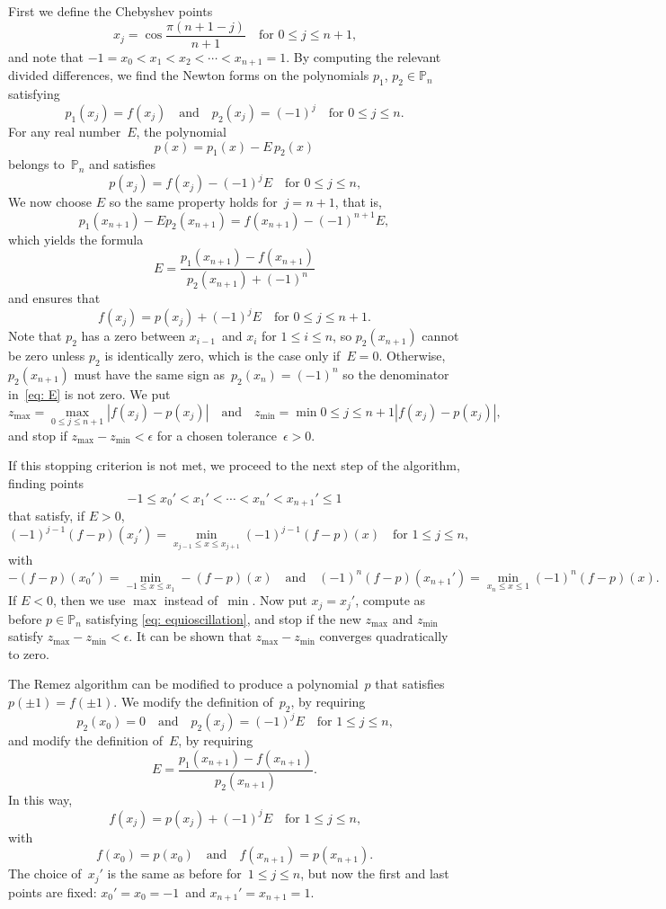\documentclass[12pt,a4paper]{article}
\begin{document}
First we define the Chebyshev points
\[
x_j=\cos\frac{\pi(n+1-j)}{n+1}\quad\text{for $0\le j\le n+1$,}
\]
and note that $-1=x_0<x_1<x_2<\cdots<x_{n+1}=1$.  By computing the relevant 
divided differences, we find the Newton forms on the polynomials $p_1$, 
$p_2\in\mathbb{P}_n$ satisfying
\[
p_1(x_j)=f(x_j)\quad\text{and}\quad p_2(x_j)=(-1)^j
\quad\text{for $0\le j\le n$.}
\]
For any real number~$E$, the polynomial
\[
p(x)=p_1(x)-E\,p_2(x)
\]
belongs to~$\mathbb{P}_n$ and satisfies
\[
p(x_j)=f(x_j)-(-1)^jE\quad\text{for $0\le j\le n$,}
\]
We now choose $E$ so the same property holds for~$j=n+1$, that is,
\[
p_1(x_{n+1})-Ep_2(x_{n+1})=f(x_{n+1})-(-1)^{n+1}E,
\]
which yields the formula
\begin{equation}\label{eq: E}
E=\frac{p_1(x_{n+1})-f(x_{n+1})}{p_2(x_{n+1})+(-1)^n}
\end{equation}
and ensures that
\begin{equation}\label{eq: equioscillation}
f(x_j)=p(x_j)+(-1)^jE\quad\text{for $0\le j\le n+1$.}
\end{equation}
Note that $p_2$ has a zero between $x_{i-1}$~and $x_i$ for $1\le i\le n$, 
so $p_2(x_{n+1})$ cannot be zero unless $p_2$ is identically zero, which is the 
case only if~$E=0$.  Otherwise, $p_2(x_{n+1})$ must have the same sign 
as~$p_2(x_n)=(-1)^n$ so the denominator in~\eqref{eq: E} is not zero.  We put
\[
z_{\max}=\max_{0\le j\le n+1}|f(x_j)-p(x_j)|
\quad\text{and}\quad
z_{\min}=\min{0\le j\le n+1}|f(x_j)-p(x_j)|,
\]
and stop if $z_{\max}-z_{\min}<\epsilon$ for a chosen tolerance~$\epsilon>0$.

If this stopping criterion is not met, we proceed to the next step of the 
algorithm, finding points
\[
-1\le x_0'< x_1'<\cdots<x_n'<x_{n+1}'\le1
\]
that satisfy, if $E>0$,
\[
(-1)^{j-1}(f-p)(x_j')=\min_{x_{j-1}\le x\le x_{j+1}}(-1)^{j-1}(f-p)(x)
\quad\text{for $1\le j\le n$,}
\]
with
\[
-(f-p)(x_0')=\min_{-1\le x\le x_1}-(f-p)(x)
\quad\text{and}\quad
(-1)^n(f-p)(x_{n+1}')=\min_{x_n\le x\le1}(-1)^n(f-p)(x).
\]
If $E<0$, then we use $\max$ instead of~$\min$.  Now put $x_j=x_j'$, compute 
as before $p\in\mathbb{P}_n$ satisfying \eqref{eq: equioscillation}, and stop 
if the new $z_{\max}$ and $z_{\min}$ satisfy $z_{\max}-z_{\min}<\epsilon$.  
It can be shown that $z_{\max}-z_{\min}$ converges quadratically to zero.

The Remez algorithm can be modified to produce a polynomial~$p$ that 
satisfies $p(\pm1)=f(\pm1)$.  We modify the definition of~$p_2$, by requiring
\[
p_2(x_0)=0\quad\text{and}\quad p_2(x_j)=(-1)^jE\quad\text{for $1\le j\le n$,}
\]
and modify the definition of~$E$, by requiring
\[
E=\frac{p_1(x_{n+1})-f(x_{n+1})}{p_2(x_{n+1})}.
\]
In this way,
\[
f(x_j)=p(x_j)+(-1)^jE\quad\text{for $1\le j\le n$,}
\]
with
\[
f(x_0)=p(x_0)\quad\text{and}\quad f(x_{n+1})=p(x_{n+1}).
\]
The choice of~$x_j'$ is the same as before for~$1\le j\le n$, but now the 
first and last points are fixed: $x_0'=x_0=-1$~and $x_{n+1}'=x_{n+1}=1$.

 



















\end{document}
